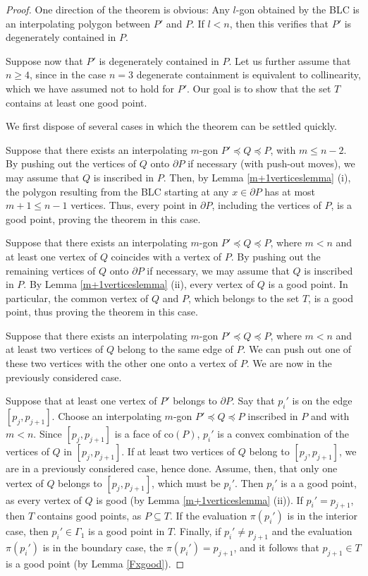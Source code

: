 \documentclass[11pt]{amsart}
\theoremstyle{remark}
\numberwithin{equation}{section}
\newcommand{\co}{\mathrm{co}}
\renewcommand{\precsim}{\preccurlyeq}
\renewcommand{\leq}{\leqslant}
\renewcommand{\geq}{\geqslant}
\begin{document}
\begin{proof}
One direction of the theorem is obvious: Any $l$-gon  obtained by the BLC is an interpolating polygon between $P'$ and $P$. 
If $l<n$, then this verifies that $P'$ is degenerately contained in $P$. 

Suppose now that $P'$ is degenerately contained in $P$.
Let us further assume that $n\geq 4$, since in the case $n=3$ degenerate containment is equivalent  to collinearity, which we have assumed not to hold for $P'$. Our goal is to show that the set $T$ contains at least one good point.

We first dispose of several cases in which the theorem can be settled quickly.

Suppose that there exists an interpolating $m$-gon  $P'\precsim Q\precsim P$, with $m\leq n-2$. By pushing out the vertices of $Q$ onto $\partial P$ if necessary
(with push-out moves), we may assume that $Q$ is inscribed in $P$. Then, by Lemma \ref{m+1verticeslemma} (i), the  polygon resulting from the BLC starting at any $x\in \partial P$ has at most $m+1\leq n-1$ vertices. Thus, every point in $\partial P$, including the vertices of $P$, is a good point,  proving the theorem in this case.

Suppose that there exists an interpolating $m$-gon  $P'\precsim Q\precsim P$, where $m<n$ and   at least one vertex of $Q$ coincides with a vertex of $P$.
By pushing out the remaining vertices of $Q$ onto $\partial P$ if necessary, we may assume that $Q$ is inscribed in $P$. 
By Lemma \ref{m+1verticeslemma} (ii), every vertex of $Q$ is a good point. In particular, the common vertex of $Q$ and $P$, which belongs to the set $T$, is a good point, thus proving the theorem in this case.


Suppose that there exists an interpolating $m$-gon  $P'\precsim Q\precsim P$, where $m<n$ and  at least two vertices of $Q$ belong to the same edge of $P$.  
We can push out one of these two vertices with the other one onto a vertex of $P$. We are now in the previously considered case.


Suppose that  at least one vertex of $P'$ belongs to $\partial P$.  Say that $p_i'$ is on the edge $[p_j,p_{j+1}]$. 
Choose an interpolating $m$-gon  $P'\precsim Q\precsim P$  inscribed in $P$ and with $m<n$.  
Since $[p_j,p_{j+1}]$ is a face of $\co(P)$, $p_i'$ is a convex combination of the vertices of $Q$
in $[p_j,p_{j+1}]$. If at least two  vertices of $Q$ belong to $[p_j,p_{j+1}]$, we are  in a  previously considered case, hence done. 
Assume, then, that only one vertex of $Q$ belongs to $[p_j,p_{j+1}]$, which must be $p_i'$. Then $p_i'$ is a a good point, as  every vertex of $Q$  is good (by Lemma \ref{m+1verticeslemma} (ii)). If $p_i'=p_{j+1}$, then $T$ contains good points, as $P\subseteq T$.
If the evaluation  $\pi(p_i')$ is in the interior case, then $p_{i}'\in \Gamma_1$ is a good point in $T$. Finally, if $p_i'\neq p_{j+1}$ and the evaluation $\pi(p_i')$ 
is in the boundary case, the $\pi(p_i')=p_{j+1}$, and it follows that $p_{j+1}\in T$ is a good point (by Lemma \ref{Fxgood}).



\end{proof}
\end{document}
